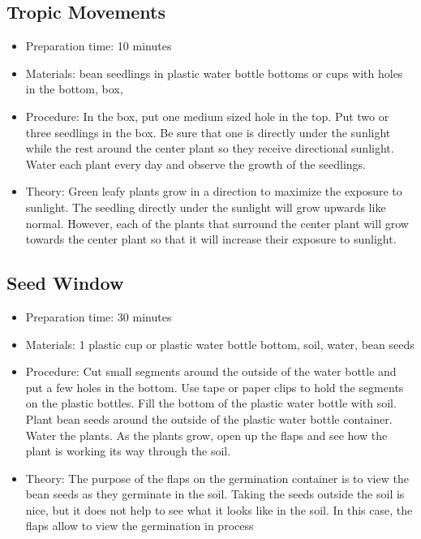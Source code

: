 \subsection{Tropic Movements}
\begin{itemize}
\item{Preparation time: 10 minutes}
\item{Materials: bean seedlings in plastic water bottle bottoms or cups with holes in the bottom, box,}
\item{Procedure: In the box, put one medium sized hole in the top. Put two or three seedlings in the box. Be sure that one is directly under the sunlight while the rest around the center plant so they receive directional sunlight. Water each plant every day and observe the growth of the seedlings.}
\item{Theory: Green leafy plants grow in a direction to maximize the exposure to sunlight. The seedling directly under the sunlight will grow upwards like normal. However, each of the plants that surround the center plant will grow towards the center plant so that it will increase their exposure to sunlight. }
\end{itemize}

\subsection{Seed Window}
\begin{itemize}
\item{Preparation time: 30 minutes }
\item{Materials: 1 plastic cup or plastic water bottle bottom, soil, water, bean seeds}
\item{Procedure: Cut small segments around the outside of the water bottle and put a few holes in the bottom. Use tape or paper clips to hold the segments on the plastic bottles. Fill the bottom of the plastic water bottle with soil. Plant bean seeds around the outside of the plastic water bottle container. Water the plants. As the plants grow, open up the flaps and see how the plant is working its way through the soil.}
\item{Theory: The purpose of the flaps on the germination container is to view the bean seeds as they germinate in the soil. Taking the seeds outside the soil is nice, but it does not help to see what it looks like in the soil. In this case, the flaps allow to view the germination in process}
\end{itemize}

